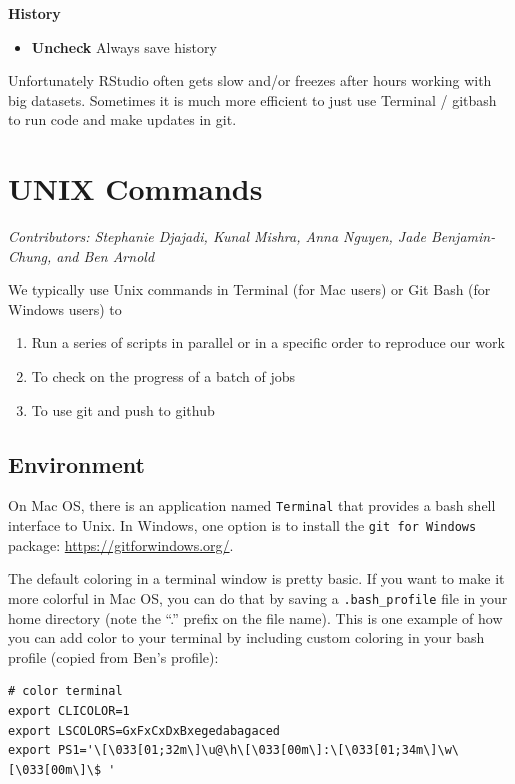 \documentclass[]{book}
\providecommand{\tightlist}{%
  \setlength{\itemsep}{0pt}\setlength{\parskip}{0pt}}
\begin{document}
\textbf{History}

\begin{itemize}
\tightlist
\item
  \textbf{Uncheck} Always save history
\end{itemize}

Unfortunately RStudio often gets slow and/or freezes after hours working with big datasets. Sometimes it is much more efficient to just use Terminal / gitbash to run code and make updates in git.

\hypertarget{unix}{%
\chapter{UNIX Commands}\label{unix}}

\emph{Contributors: Stephanie Djajadi, Kunal Mishra, Anna Nguyen, Jade Benjamin-Chung, and Ben Arnold}

We typically use Unix commands in Terminal (for Mac users) or Git Bash (for Windows users) to

\begin{enumerate}
\def\labelenumi{\arabic{enumi}.}
\tightlist
\item
  Run a series of scripts in parallel or in a specific order to reproduce our work
\item
  To check on the progress of a batch of jobs
\item
  To use git and push to github
\end{enumerate}

\hypertarget{environment}{%
\section{Environment}\label{environment}}

On Mac OS, there is an application named \texttt{Terminal} that provides a bash shell interface to Unix. In Windows, one option is to install the \texttt{git\ for\ Windows} package: \url{https://gitforwindows.org/}.

The default coloring in a terminal window is pretty basic. If you want to make it more colorful in Mac OS, you can do that by saving a \texttt{.bash\_profile} file in your home directory (note the ``.'' prefix on the file name). This is one example of how you can add color to your terminal by including custom coloring in your bash profile (copied from Ben's profile):

\begin{verbatim}
# color terminal
export CLICOLOR=1
export LSCOLORS=GxFxCxDxBxegedabagaced
export PS1='\[\033[01;32m\]\u@\h\[\033[00m\]:\[\033[01;34m\]\w\[\033[00m\]\$ '
\end{verbatim}
\end{document}
